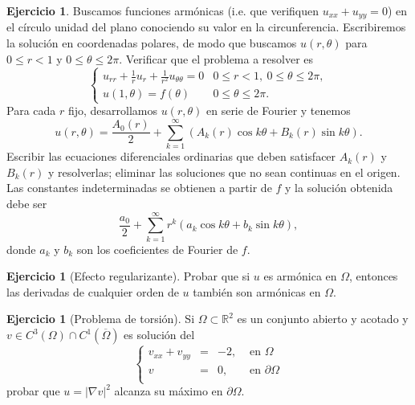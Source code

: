 \documentclass[12pt, a4paper]{amsbook}
\newcommand{\R}{{\mathbb R}}
\theoremstyle{remark}
\theoremstyle{definition}
\newtheorem{ejer}[teo]{Ejercicio}
\numberwithin{section}{chapter}
\numberwithin{subsection}{section}
\numberwithin{equation}{section}
\numberwithin{figure}{chapter}
\begin{document}
\begin{ejer}
Buscamos funciones armónicas (i.e. que verifiquen $u_{xx} + u_{yy} = 0$) en el círculo unidad del plano conociendo su valor en la circunferencia. Escribiremos la solución en coordenadas polares, de modo que buscamos $u(r,\theta)$ para $0\le r<1$ y $0\le \theta\le 2\pi$. Verificar que el problema a resolver es
$$
\begin{cases}
u_{rr} + \frac{1}{r}u_r + \frac{1}{r^2}u_{\theta\theta} = 0 & 0\le r<1,\ 0\le \theta\le 2\pi,\\
u(1,\theta)=f(\theta) & 0\le \theta\le 2\pi.
\end{cases}
$$
Para cada $r$ fijo, desarrollamos $u(r,\theta)$ en serie de Fourier y tenemos
$$
u(r,\theta)= \frac{A_0(r)}{2} + \sum_{k=1}^\infty (A_k(r)\cos k\theta + B_k(r)\sin k\theta).
$$
Escribir las ecuaciones diferenciales ordinarias que deben satisfacer $A_k(r)$ y $B_k(r)$ y resolverlas; eliminar las soluciones que no sean continuas en el origen. Las constantes indeterminadas se obtienen a partir de $f$ y la solución obtenida debe ser
$$
\frac{a_0}{2} + \sum_{k=1}^\infty r^k (a_k\cos k\theta + b_k \sin k\theta),
$$
donde $a_k$ y $b_k$ son los coeficientes de Fourier de $f$.
\end{ejer}


\begin{ejer}[Efecto regularizante] 
Probar que si $u$ es armónica en $\Omega$, entonces las derivadas de cualquier orden de $u$ también son armónicas en $\Omega$.
\end{ejer}

\begin{ejer}[Problema de torsión] Si $\Omega\subset \R^2$ es un conjunto abierto y acotado y $v\in C^3(\Omega)\cap C^1(\overline\Omega)$ es solución del 
$$
\left\{
\begin{array}{rcll}
v_{xx} + v_{yy} & = & -2, & \text{ en } \Omega\\
v & = & 0, & \text{ en } \partial\Omega\\
\end{array}
\right.
$$
probar que $u=|\nabla v|^2$ alcanza su máximo en $\partial\Omega$.
\end{ejer}

%
\end{document}
